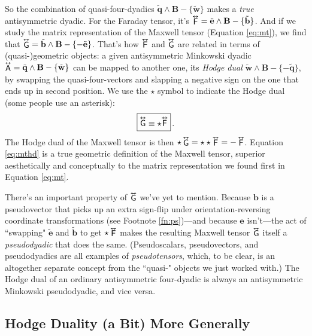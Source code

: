 \documentclass[12pt]{article}
\renewcommand{\vv}[1]{\mathbf{#1}}
\newcommand{\tightoverset}[2]{%
  \mathop{#2}\limits^{\vbox to -.5ex{\kern-0.75ex\hbox{$#1$}\vss}}}
\newcommand{\inlinedy}[1]{\tightoverset{\text{\tiny$\bm\leftrightarrow$}}{#1}}
\newcommand{\capdy}[1]{ \overset{ \text{\tiny$\bm\leftrightarrow$} }{\vphantom{\text{\small{A}}}\smash{#1}} }
\begin{document}

So the combination of quasi-four-dyadics $\tilde{\vv q} \wedge \vv B - \{ \tilde{\vv w} \}$ makes a \emph{true} antisymmetric dyadic. For the Faraday tensor, it's $\inlinedy{\mathsf{F}} = \tilde{\vv e} \wedge \vv B - \{ \tilde{\vv b} \}$. And if we study the matrix representation of the Maxwell tensor (Equation \ref{eq:mt}), we find that $\inlinedy{\mathsf{G}} = \tilde{\vv b} \wedge \vv B - \{ - \tilde{\vv e} \}$. That's how $\inlinedy{\mathsf{F}}$ and $\inlinedy{\mathsf{G}}$ are related in terms of (quasi-)geometric objects: a given antisymmetric Minkowski dyadic ${\inlinedy{\mathsf{A}} = \tilde{\vv q} \wedge \vv B - \{ \tilde{\vv w} \}}$ can be mapped to another one, its \emph{Hodge dual} ${\tilde{\vv w} \wedge \vv B - \{ - \tilde{\vv q} \}}$, by swapping the quasi-four-vectors and slapping a negative sign on the one that ends up in second position. We use the $\star$ symbol to indicate the Hodge dual (some people use an asterisk):
\begin{equation}\label{eq:mthd}
\boxed{ \vphantom{A_{A_A}} \capdy{\mathsf{G}} \equiv \star \capdy{\mathsf{F}} } \, .
\end{equation}
The Hodge dual of the Maxwell tensor is then $\star \inlinedy{\mathsf{G}} = \star \star \inlinedy{\mathsf{F}} = - \inlinedy{\mathsf{F}}$. Equation \ref{eq:mthd} is a true geometric definition of the Maxwell tensor, superior aesthetically and conceptually to the matrix representation we found first in Equation \ref{eq:mt}.

There's an important property of $\inlinedy{\mathsf{G}}$ we've yet to mention. Because $\vv b$ is a pseudovector that picks up an extra sign-flip under orientation-reversing coordinate transformations (see Footnote \ref{fn:ps})---and because $\vv e$ isn't---the act of ``swapping" $\tilde{\vv e}$ and $\tilde{\vv b}$ to get $\star \inlinedy{\mathsf{F}}$ makes the resulting Maxwell tensor $\inlinedy{\mathsf{G}}$ itself a \emph{pseudodyadic} that does the same. (Pseudoscalars, pseudovectors, and pseudodyadics are all examples of \emph{pseudotensors}, which, to be clear, is an altogether separate concept from the ``quasi-" objects we just worked with.) The Hodge dual of an ordinary antisymmetric four-dyadic is always an antisymmetric Minkowski pseudodyadic, and vice versa.

\subsection{Hodge Duality (a Bit) More Generally}
\end{document}
